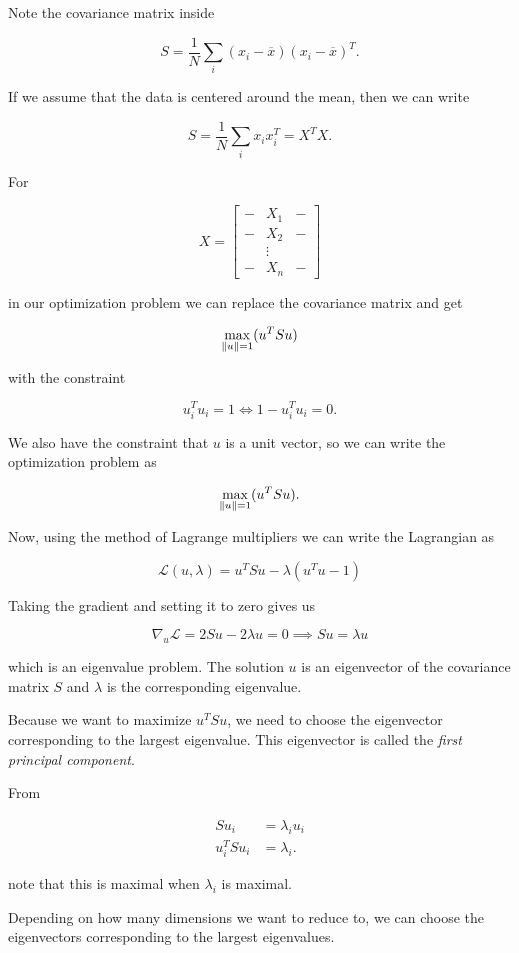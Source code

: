 Note the covariance matrix inside

\[
	S = \frac{1}{N} \sum_i (x_i - \overline{x})(x_i - \overline{x})^T.
\]

If we assume that the data is centered around the mean, then we can write

\[
	S = \frac{1}{N} \sum_i x_i x_i^T = X^TX.
\]

For

\[
	X =
	\begin{bmatrix}
		- & X_1    & - \\
		- & X_2    & - \\
		  & \vdots &   \\
		- & X_n    & -
	\end{bmatrix}
\]

in our optimization problem we can replace the covariance matrix and get

\[
	\max_{\left\| u \right\| = 1} (u^T S u)
\]

with the constraint

\[
	u_i^T u_i = 1 \iff 1 - u_i^T u_i = 0.
\]

We also have the constraint that \(u\) is a unit vector, so we can write the optimization problem as

\[
	\max_{\left\| u \right\| = 1} (u^T S u).
\]

Now, using the method of Lagrange multipliers we can write the Lagrangian as

\[
	\mathcal{L}(u, \lambda) = u^T S u - \lambda (u^T u - 1)
\]

Taking the gradient and setting it to zero gives us

\[
	\nabla_u \mathcal{L} = 2Su - 2\lambda u = 0 \implies Su = \lambda u
\]

which is an eigenvalue problem. The solution \(u\) is an eigenvector of the covariance matrix \(S\) and \(\lambda\) is the corresponding eigenvalue.

Because we want to maximize \(u^T S u\), we need to choose the eigenvector corresponding to the largest eigenvalue.
This eigenvector is called the \emph{first principal component}.

From

\begin{align*}
	S u_i & = \lambda_i u_i \\
	u_i^T S u_i &= \lambda_i.
\end{align*}

note that this is maximal when \(\lambda_i\) is maximal.

Depending on how many dimensions we want to reduce to, we can choose the eigenvectors corresponding to the largest eigenvalues.


